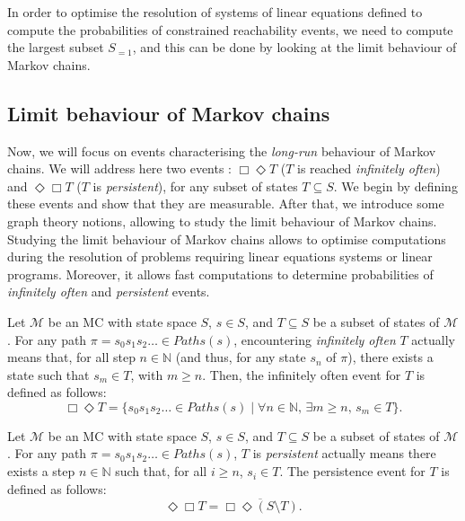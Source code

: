 In order to optimise the resolution of systems of linear equations defined to compute the probabilities of constrained reachability events,
we need to compute the largest subset $S_{=1}$, and this can be done by looking at the limit behaviour of Markov chains.

\subsection{Limit behaviour of Markov chains}\label{temp-event-mdp}
Now, we will focus on events characterising the \textit{long-run} behaviour of Markov chains. We will address here two events : $\Box\Diamond T$ ($T$ is reached \textit{infinitely often})
and $\Diamond \Box T$ ($T$ is \textit{persistent}), for any subset of states $T \subseteq S$.
We begin by defining these events and show that they are measurable. After that, we introduce some graph theory notions, allowing to study the limit behaviour of Markov chains.
Studying the limit behaviour of Markov chains allows to optimise
computations during the resolution of problems requiring linear equations systems or linear programs. Moreover, it allows fast computations to determine probabilities of \textit{infinitely often} and \textit{persistent} events.

\begin{definition}
  Let $\mathcal{M}$ be an MC with state space $S$, $s \in S$, and $T \subseteq S$ be a subset of states of $\mathcal{M}$. For any path $\pi = s_0 s_1 s_2 \dots \in Paths(s)$,
encountering \textit{infinitely often} $T$ actually means that, for all step $n \in \mathbb{N}$ (and thus, for any state $s_n$ of $\pi$), there exists a state such that $s_m \in T$, with $m \geq n$.
Then, the infinitely often event for $T$ is defined as follows:
\[
  \Box\Diamond T = \{ s_0 s_1 s_2 \dots \in Paths(s) \; | \; \forall n \in \mathbb{N}, \, \exists m \geq n, \, s_m \in T \}.
\]
\end{definition}

\begin{definition}
  Let $\mathcal{M}$ be an MC with state space $S$, $s \in S$, and $T \subseteq S$ be a subset of states of $\mathcal{M}$.
  For any path $\pi = s_0 s_1 s_2 \dots \in Paths(s)$,
 $T$ is \textit{persistent} actually means there exists a step $n \in \mathbb{N}$ such that, for all $i\geq n$, $s_i \in T$. The persistence event for $T$ is defined as follows:
 \[
  \Diamond \Box T = \overline{\Box \Diamond (S \setminus T)}.
 \]
\end{definition}


